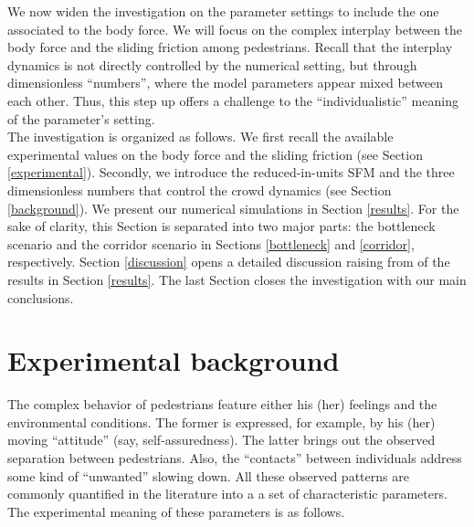 \documentclass[preprint,12pt]{elsarticle}
\begin{document}
We now widen the investigation on the parameter settings to include the one 
associated to the body force. We will focus on the complex interplay between 
the body force and the sliding friction among pedestrians. Recall that the 
interplay dynamics is not directly controlled by the numerical setting, but 
through dimensionless ``numbers'', where the model parameters appear mixed 
between each other. Thus, this step up offers a challenge to the 
``individualistic'' meaning of the parameter's setting. \\  


The investigation is organized as follows. We first recall the available 
experimental values on the body force and the sliding friction (see Section 
\ref{experimental}). Secondly, we introduce the reduced-in-units SFM and the 
three dimensionless numbers that control the crowd dynamics (see Section 
\ref{background}). We present our numerical simulations in Section 
\ref{results}. For the sake of clarity, this Section is 
separated into two major parts: the bottleneck scenario and the corridor 
scenario in Sections \ref{bottleneck} and \ref{corridor}, respectively. 
Section \ref{discussion} opens a detailed discussion raising from of the results 
in Section \ref{results}. The last Section closes the investigation with our 
main conclusions.

\section{\label{experimental}Experimental background}

The complex behavior of pedestrians feature either his (her) feelings and 
the environmental conditions. The former is expressed, for example, by his 
(her) moving ``attitude'' (say, self-assuredness). The latter brings out the 
observed separation between pedestrians. Also, the ``contacts'' between 
individuals address some kind of ``unwanted'' slowing down. All these 
observed patterns are commonly quantified in the literature into a a set of 
characteristic  parameters. The experimental meaning of these parameters is as 
follows.
\end{document}
